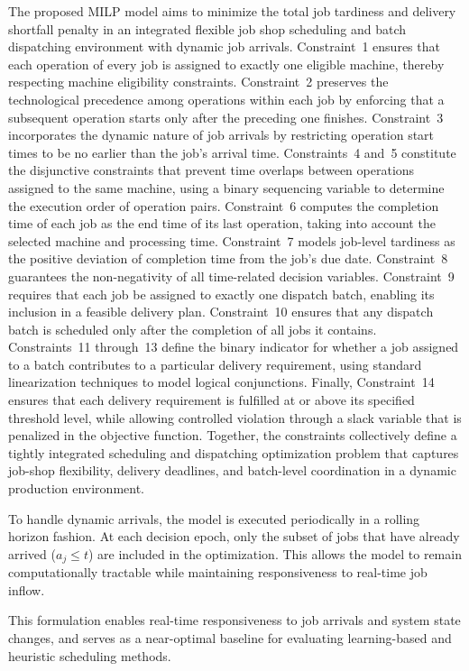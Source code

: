 \documentclass{article}
\begin{document}
The proposed MILP model aims to minimize the total job tardiness and delivery shortfall penalty in an integrated flexible job shop scheduling and batch dispatching environment with dynamic job arrivals. Constraint~1 ensures that each operation of every job is assigned to exactly one eligible machine, thereby respecting machine eligibility constraints. Constraint~2 preserves the technological precedence among operations within each job by enforcing that a subsequent operation starts only after the preceding one finishes. Constraint~3 incorporates the dynamic nature of job arrivals by restricting operation start times to be no earlier than the job's arrival time. Constraints~4 and~5 constitute the disjunctive constraints that prevent time overlaps between operations assigned to the same machine, using a binary sequencing variable to determine the execution order of operation pairs. Constraint~6 computes the completion time of each job as the end time of its last operation, taking into account the selected machine and processing time. Constraint~7 models job-level tardiness as the positive deviation of completion time from the job’s due date. Constraint~8 guarantees the non-negativity of all time-related decision variables. Constraint~9 requires that each job be assigned to exactly one dispatch batch, enabling its inclusion in a feasible delivery plan. Constraint~10 ensures that any dispatch batch is scheduled only after the completion of all jobs it contains. Constraints~11 through~13 define the binary indicator for whether a job assigned to a batch contributes to a particular delivery requirement, using standard linearization techniques to model logical conjunctions. Finally, Constraint~14 ensures that each delivery requirement is fulfilled at or above its specified threshold level, while allowing controlled violation through a slack variable that is penalized in the objective function. Together, the constraints collectively define a tightly integrated scheduling and dispatching optimization problem that captures job-shop flexibility, delivery deadlines, and batch-level coordination in a dynamic production environment.

To handle dynamic arrivals, the model is executed periodically in a rolling horizon fashion. At each decision epoch, only the subset of jobs that have already arrived (\( a_j \leq t \)) are included in the optimization. This allows the model to remain computationally tractable while maintaining responsiveness to real-time job inflow.

This formulation enables real-time responsiveness to job arrivals and system state changes, and serves as a near-optimal baseline for evaluating learning-based and heuristic scheduling methods.
\end{document}
